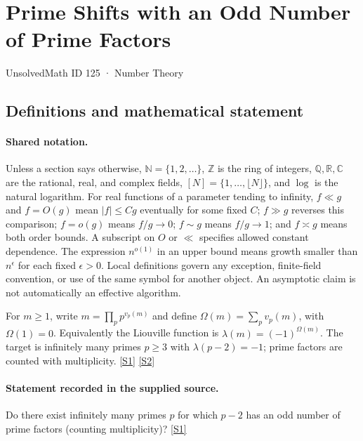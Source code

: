 \documentclass[11pt,a4paper]{article}
\newcommand{\N}{\mathbb{N}}
\newcommand{\Z}{\mathbb{Z}}
\newcommand{\Q}{\mathbb{Q}}
\newcommand{\R}{\mathbb{R}}
\newcommand{\C}{\mathbb{C}}
\newcommand{\sref}[2]{\hyperlink{source:#1:#2}{[S#2]}}
\begin{document}

\setcounter{section}{124}

\section{Prime Shifts with an Odd Number of Prime Factors}\label{125}

{\small\sffamily UnsolvedMath ID 125 · Number Theory}

\subsection{Definitions and mathematical statement}

\paragraph{Shared notation.}Unless a section says otherwise, $\N=\{1,2,\ldots\}$,
$\Z$ is the ring of integers, $\Q,\R,\C$ are the rational, real, and complex
fields, $[N]=\{1,\ldots,\lfloor N\rfloor\}$, and $\log$ is the natural
logarithm. For real functions of a parameter tending to infinity,
$f\ll g$ and $f=O(g)$ mean $|f|\leq Cg$ eventually for some fixed $C$;
$f\gg g$ reverses this comparison; $f=o(g)$ means $f/g\to0$;
$f\sim g$ means $f/g\to1$; and $f\asymp g$ means both order bounds.
A subscript on $O$ or $\ll$ specifies allowed constant dependence.
The expression $n^{o(1)}$ in an upper bound means growth smaller than
$n^\epsilon$ for each fixed $\epsilon>0$. Local definitions govern any
exception, finite-field convention, or use of the same symbol for another
object. An asymptotic claim is not automatically an effective algorithm.



For $m\geq1$, write $m=\prod_p p^{v_p(m)}$ and define $\Omega(m)=\sum_p v_p(m)$, with $\Omega(1)=0$. Equivalently the Liouville function is $\lambda(m)=(-1)^{\Omega(m)}$. The target is infinitely many primes $p\geq3$ with $\lambda(p-2)=-1$; prime factors are counted with multiplicity. \sref{125}{1} \sref{125}{2}

\paragraph{Statement recorded in the supplied source.}
Do there exist infinitely many primes $p$ for which $p-2$ has an odd number of prime factors (counting multiplicity)? \sref{125}{1}
\end{document}
